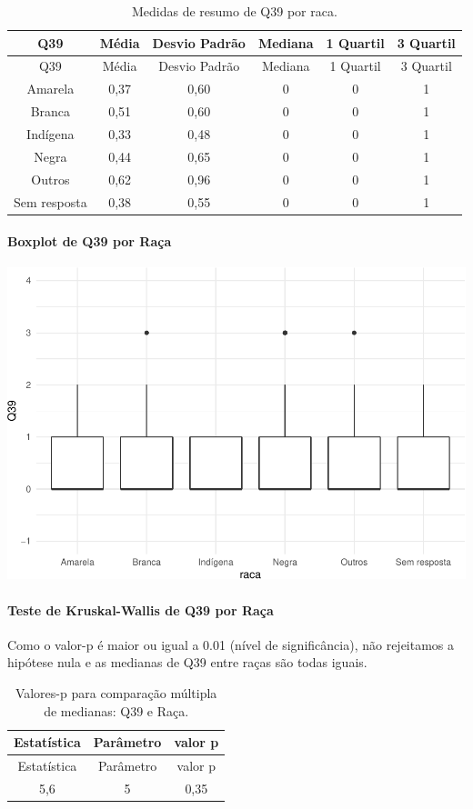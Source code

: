 \documentclass[]{article}
\let\oldparagraph\paragraph
\renewcommand{\paragraph}[1]{\oldparagraph{#1}\mbox{}}
\begin{document}
\begin{longtable}[]{@{}cccccc@{}}
\caption{\label{tab:unnamed-chunk-1522}Medidas de resumo de Q39 por raca.}\tabularnewline
\toprule
Q39 & Média & Desvio Padrão & Mediana & 1 Quartil & 3 Quartil\tabularnewline
\midrule
\endfirsthead
\toprule
Q39 & Média & Desvio Padrão & Mediana & 1 Quartil & 3 Quartil\tabularnewline
\midrule
\endhead
Amarela & 0,37 & 0,60 & 0 & 0 & 1\tabularnewline
Branca & 0,51 & 0,60 & 0 & 0 & 1\tabularnewline
Indígena & 0,33 & 0,48 & 0 & 0 & 1\tabularnewline
Negra & 0,44 & 0,65 & 0 & 0 & 1\tabularnewline
Outros & 0,62 & 0,96 & 0 & 0 & 1\tabularnewline
Sem resposta & 0,38 & 0,55 & 0 & 0 & 1\tabularnewline
\bottomrule
\end{longtable}

\hypertarget{boxplot-de-q39-por-rauxe7a}{%
\paragraph{Boxplot de Q39 por Raça}\label{boxplot-de-q39-por-rauxe7a}}

\begin{center}\includegraphics[width=0.75\linewidth]{relatorio_covid19_files/figure-latex/unnamed-chunk-1523-1} \end{center}

\hypertarget{teste-de-kruskal-wallis-de-q39-por-rauxe7a}{%
\paragraph{Teste de Kruskal-Wallis de Q39 por Raça}\label{teste-de-kruskal-wallis-de-q39-por-rauxe7a}}

Como o valor-p é maior ou igual a 0.01 (nível de significância), não rejeitamos a hipótese nula e as medianas de Q39 entre raças são todas iguais.

\begin{longtable}[]{@{}ccc@{}}
\caption{\label{tab:unnamed-chunk-1525}Valores-p para comparação múltipla de medianas: Q39 e Raça.}\tabularnewline
\toprule
Estatística & Parâmetro & valor p\tabularnewline
\midrule
\endfirsthead
\toprule
Estatística & Parâmetro & valor p\tabularnewline
\midrule
\endhead
5,6 & 5 & 0,35\tabularnewline
\bottomrule
\end{longtable}
\end{document}
